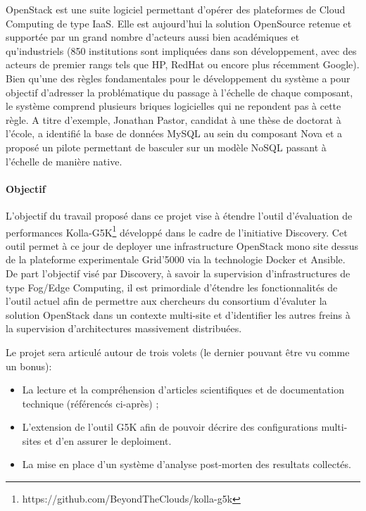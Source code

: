 \documentclass[a4paper,11pt]{article}
\begin{document}
\begin{note}
OpenStack est une suite logiciel permettant d'opérer des plateformes
de Cloud Computing de type IaaS. Elle est aujourd'hui la solution
OpenSource retenue et supportée par un grand nombre d'acteurs aussi
bien académiques et qu'industriels (850 institutions sont impliquées
dans son développement, avec des acteurs de premier rangs tels que HP,
RedHat ou encore plus récemment Google).  Bien qu'une des règles
fondamentales pour le développement du système a pour objectif
d'adresser la problématique du passage à l'échelle de chaque
composant, le système comprend plusieurs briques logicielles qui ne
repondent pas à cette règle. A titre d'exemple, Jonathan Pastor,
candidat à une thèse de doctorat à l'école, a identifié la base de
données MySQL au sein du composant Nova et a proposé un pilote
permettant de basculer sur un modèle NoSQL passant à l'échelle de
manière native. 



\paragraph*{Objectif\\}
L'objectif du travail proposé dans ce projet vise à étendre l'outil
d'évaluation de performances
Kolla-G5K\footnote{https://github.com/BeyondTheClouds/kolla-g5k}
développé dans le cadre de l'initiative Discovery. Cet outil permet à
ce jour de deployer une infrastructure OpenStack mono site dessus de
la plateforme experimentale Grid'5000 via la technologie Docker et
Ansible.  De part l'objectif visé par Discovery, à savoir la
supervision d'infrastructures de type Fog/Edge Computing, il est
primordiale d'étendre les fonctionnalités de l'outil actuel afin de
permettre aux chercheurs du consortium d'évaluter la solution
OpenStack dans un contexte multi-site et d'identifier les autres
freins à la supervision d'architectures massivement distribuées.

Le projet sera articulé autour de trois volets (le dernier pouvant être vu comme un bonus):
\begin{itemize}
\item La lecture et la compréhension d'articles scientifiques et de documentation technique (référencés ci-après) ; 
\item L'extension de l'outil G5K afin de pouvoir décrire des configurations multi-sites et d'en assurer le deploiment.
\item La mise en place d'un système d'analyse post-morten des resultats collectés. 
\end{itemize}


\end{note}
\end{document}
